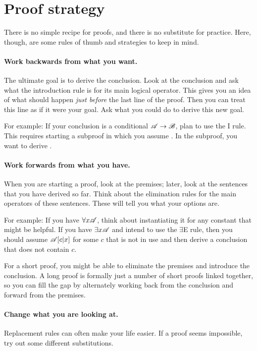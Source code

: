 \section{Proof strategy}

There is no simple recipe for proofs, and there is no substitute for practice. Here, though, are some rules of thumb and strategies to keep in mind.

\paragraph{Work backwards from what you want.}
The ultimate goal is to derive the conclusion. Look at the conclusion and ask what the introduction rule is for its main logical operator. This gives you an idea of what should happen \emph{just before} the last line of the proof. Then you can treat this line as if it were your goal. Ask what you could do to derive this new goal.

For example: If your conclusion is a conditional $\mathscr{A}\rightarrow\mathscr{B}$, plan to use the {\eif}I rule. This requires starting a subproof in which you assume . In the subproof, you want to derive .

\paragraph{Work forwards from what you have.}
When you are starting a proof, look at the premises; later, look at the sentences that you have derived so far. Think about the elimination rules for the main operators of these sentences. These will tell you what your options are.

For example: If you have $\forall x\mathscr{A}$, think about instantiating it for any constant that might be helpful. If you have $\exists x\mathscr{A}$ and intend to use the $\exists$E rule, then you should assume $\mathscr{A}[c|x]$ for some $c$ that is not in use and then derive a conclusion that does not contain $c$.

For a short proof, you might be able to eliminate the premises and introduce the conclusion. A long proof is formally just a number of short proofs linked together, so you can fill the gap by alternately working back from the conclusion and forward from the premises.


\paragraph{Change what you are looking at.}
Replacement rules can often make your life easier. If a proof seems impossible, try out some different substitutions.

